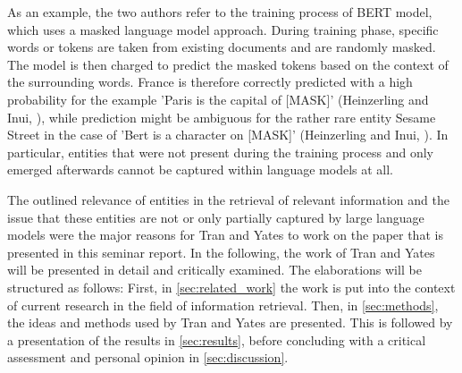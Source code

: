 As an example, the two authors refer to the training process of BERT model, which uses a masked language model approach. During training phase, specific words or tokens are taken from existing documents and are randomly masked. The model is then charged to predict the masked tokens based on the context of the surrounding words. France is therefore correctly predicted with a high probability for the example 'Paris is the capital of [MASK]' (Heinzerling and Inui, \cite{limitations}), while prediction might be ambiguous for the rather rare entity Sesame Street in the case of 'Bert is a character on [MASK]' (Heinzerling and Inui, \cite{limitations}). In particular, entities that were not present during the training process and only emerged afterwards cannot be captured within language models at all.

The outlined relevance of entities in the retrieval of relevant information and the issue that these entities are not or only partially captured by large language models were the major reasons for Tran and Yates \cite{tran2022dense} to work on the paper that is presented in this seminar report. In the following, the work of Tran and Yates will be presented in detail and critically examined. The elaborations will be structured as follows: First, in \autoref{sec:related_work} the work is put into the context of current research in the field of information retrieval. Then, in \autoref{sec:methods}, the ideas and methods used by Tran and Yates are presented. This is followed by a presentation of the results in \autoref{sec:results}, before concluding with a critical assessment and personal opinion in \autoref{sec:discussion}.

